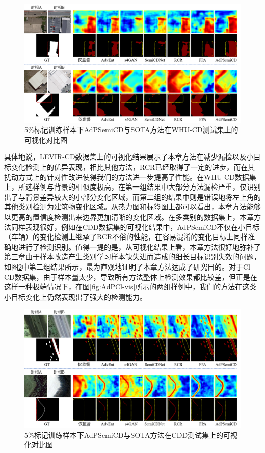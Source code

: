 \documentclass[lang=chs, degree=master, blindreview=false, adobe=false]{yanputhesis}
\begin{document}
\begin{figure}[!htbp]
  \centering
  \includegraphics[scale=0.45]{images/AdPwhu-vis.png}
  \caption{
    5$\%$标记训练样本下AdPSemiCD与SOTA方法在WHU-CD测试集上的可视化对比图
  }
  \label{fig:AdPWhu-vis}
\end{figure}

具体地说，LEVIR-CD数据集上的可视化结果展示了本章方法在减少漏检以及小目标变化检测上的优异表现，相比其他方法，RCR已经取得了一定的进步，而在其扰动方式上的针对性改进使得我们的方法进一步提高了性能。在WHU-CD数据集上，所选样例与背景的相似度极高，在第一组结果中大部分方法漏检严重，仅识别出了与背景差异较大的小部分变化区域，而第二组的结果中则是错误地将左上角的其他类别检测为建筑物变化区域。从热力图和标签图上都可以看出，本章方法能够以更高的置信度检测出来边界更加清晰的变化区域。在多类别的数据集上，本章方法同样表现很好，例如在CDD数据集的可视化结果中，AdPSemiCD不仅在小目标（车辆）的变化检测上继承了RCR不俗的性能，在容易混淆的变化目标上同样准确地进行了检测识别。值得一提的是，从可视化结果上看，本章方法很好地弥补了第三章由于样本改造产生类别学习样本缺失进而造成的细长目标识别失效的问题，如图\ref{fig:AdPCdd-vis}中第二组结果所示，最为直观地证明了本章方法达成了研究目的。对于Cl-CD数据集，由于样本量太少，导致所有方法整体上检测效果都比较差，但正是在这样一种极端情况下，在图\ref{fig:AdPCl-vis}所示的两组样例中，我们的方法在这类小目标变化上仍然表现出了强大的检测能力。
\begin{figure}[!htbp]
  \centering
  \includegraphics[scale=0.45]{images/AdPcdd-vis.png}
  \caption{
    5$\%$标记训练样本下AdPSemiCD与SOTA方法在CDD测试集上的可视化对比图
  }
  \label{fig:AdPCdd-vis}
\end{figure}
\end{document}
